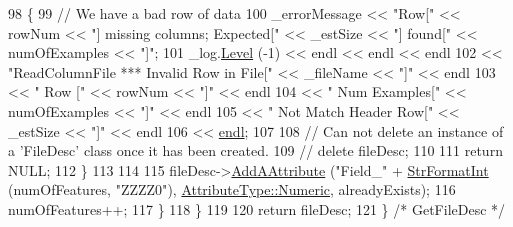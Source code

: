 \begin{DoxyCode}
98       \{
99         \textcolor{comment}{// We have a bad row of data}
100         \_errorMessage << \textcolor{stringliteral}{"Row["} << rowNum << \textcolor{stringliteral}{"] missing columns;  Expected["} << \_estSize << \textcolor{stringliteral}{"] found["} << 
      numOfExamples << \textcolor{stringliteral}{"]"};
101         \_log.\hyperlink{class_k_k_b_1_1_run_log_a32cf761d7f2e747465fd80533fdbb659}{Level} (-1) << endl << endl << endl 
102                         << \textcolor{stringliteral}{"ReadColumnFile    *** Invalid Row in File["} << \_fileName << \textcolor{stringliteral}{"]"} << endl
103                         << \textcolor{stringliteral}{"         Row         ["} << rowNum           << \textcolor{stringliteral}{"]"} << endl
104                         << \textcolor{stringliteral}{"         Num Examples["} << numOfExamples    << \textcolor{stringliteral}{"]"} << endl
105                         << \textcolor{stringliteral}{"         Not Match Header Row["} << \_estSize << \textcolor{stringliteral}{"]"} << endl
106                         << \hyperlink{namespace_k_k_b_ad1f50f65af6adc8fa9e6f62d007818a8}{endl};
107 
108         \textcolor{comment}{// Can not delete an instance of a 'FileDesc' class once it has been created.}
109         \textcolor{comment}{// delete  fileDesc;}
110 
111         \textcolor{keywordflow}{return} NULL;
112       \}
113 
114 
115       fileDesc->\hyperlink{class_k_k_m_l_l_1_1_file_desc_ab920163b3e6155197bfc1bf2045555ca}{AddAAttribute} (\textcolor{stringliteral}{"Field\_"} + \hyperlink{namespace_k_k_b_ae3bde258fa036604fac8bdb0277ab46e}{StrFormatInt} (numOfFeatures, \textcolor{stringliteral}{"ZZZZ0"}), 
      \hyperlink{namespace_k_k_m_l_l_a99973706982b59debba670e2480555aba87322391cc6e8948ce9fd5d6cb84fced}{AttributeType::Numeric}, alreadyExists);
116       numOfFeatures++;
117     \}
118   \}
119 
120   \textcolor{keywordflow}{return}  fileDesc;
121 \}  \textcolor{comment}{/* GetFileDesc */}
\end{DoxyCode}

